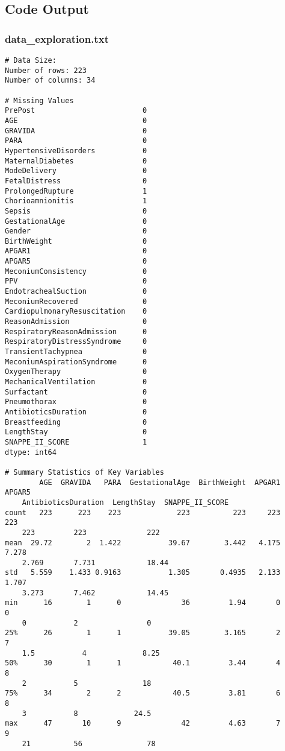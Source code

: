 \documentclass[11pt]{article}
\begin{document}
\subsection{Code Output}

\subsubsection*{data\_exploration.txt}

\begin{Verbatim}[tabsize=4]
# Data Size:
Number of rows: 223
Number of columns: 34

# Missing Values
PrePost                         0
AGE                             0
GRAVIDA                         0
PARA                            0
HypertensiveDisorders           0
MaternalDiabetes                0
ModeDelivery                    0
FetalDistress                   0
ProlongedRupture                1
Chorioamnionitis                1
Sepsis                          0
GestationalAge                  0
Gender                          0
BirthWeight                     0
APGAR1                          0
APGAR5                          0
MeconiumConsistency             0
PPV                             0
EndotrachealSuction             0
MeconiumRecovered               0
CardiopulmonaryResuscitation    0
ReasonAdmission                 0
RespiratoryReasonAdmission      0
RespiratoryDistressSyndrome     0
TransientTachypnea              0
MeconiumAspirationSyndrome      0
OxygenTherapy                   0
MechanicalVentilation           0
Surfactant                      0
Pneumothorax                    0
AntibioticsDuration             0
Breastfeeding                   0
LengthStay                      0
SNAPPE_II_SCORE                 1
dtype: int64

# Summary Statistics of Key Variables
        AGE  GRAVIDA   PARA  GestationalAge  BirthWeight  APGAR1  APGAR5
	AntibioticsDuration  LengthStay  SNAPPE_II_SCORE
count   223      223    223             223          223     223     223
	223         223              222
mean  29.72        2  1.422           39.67        3.442   4.175   7.278
	2.769       7.731            18.44
std   5.559    1.433 0.9163           1.305       0.4935   2.133   1.707
	3.273       7.462            14.45
min      16        1      0              36         1.94       0       0
	0           2                0
25%      26        1      1           39.05        3.165       2       7
	1.5           4             8.25
50%      30        1      1            40.1         3.44       4       8
	2           5               18
75%      34        2      2            40.5         3.81       6       8
	3           8             24.5
max      47       10      9              42         4.63       7       9
	21          56               78


\end{Verbatim}
\end{document}
